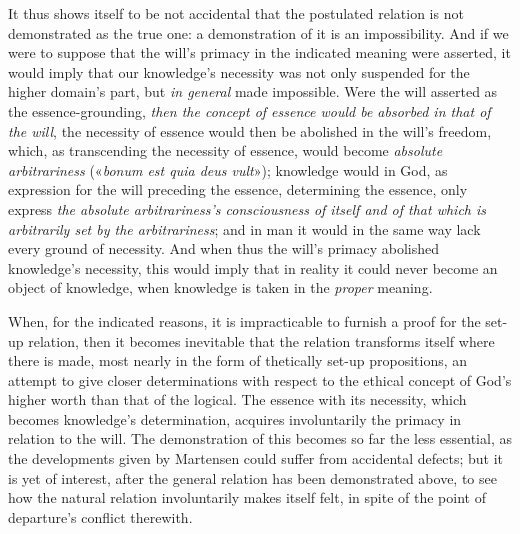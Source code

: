 \documentclass[12pt,a4paper]{book}
\begin{document}
It thus shows itself to be not accidental that the postulated relation is not
demonstrated as the true one: a demonstration of it is an impossibility. And if we
were to suppose that the will's primacy in the indicated meaning were asserted, it
would imply that our knowledge's necessity was not only suspended for the higher
domain's part, but \emph{in general} made impossible. Were the will asserted as the
essence-grounding, \emph{then the concept of essence would be absorbed in that of the will},
the necessity of essence would then be abolished in the will's freedom, which, as
transcending the necessity of essence, would become \emph{absolute arbitrariness}
(«\textit{bonum est quia deus vult}»); knowledge would in God, as expression for the
will preceding the essence, determining the essence, only express \emph{the absolute
arbitrariness's consciousness of itself and of that which is arbitrarily set by the
arbitrariness}; and in man it would in the same way lack every ground of necessity.
And when thus the will's primacy abolished knowledge's necessity, this would imply
that in reality it could never become an object of knowledge, when knowledge is taken
in the \emph{proper} meaning.

When, for the indicated reasons, it is impracticable to furnish a proof for the set-up
relation, then it becomes inevitable that the relation transforms itself where there
is made, most nearly in the form of thetically set-up propositions, an attempt to give
closer determinations with respect to the ethical concept of God's higher worth than
that of the logical. The essence with its necessity, which becomes knowledge's
determination, acquires involuntarily the primacy in relation to the will. The
demonstration of this becomes so far the less essential, as the developments given by
Martensen could suffer from accidental defects; but it is yet of interest, after the
general relation has been demonstrated above, to see how the natural relation
involuntarily makes itself felt, in spite of the point of departure's conflict
therewith.
\end{document}
